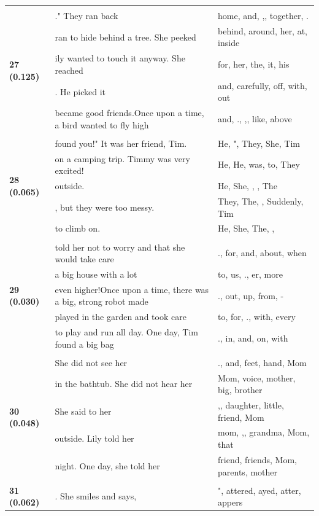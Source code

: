 \documentclass{article}
\theoremstyle{plain}
\theoremstyle{definition}
\theoremstyle{remark}
\begin{document}
\begin{longtable}{|p{}|p{}|p{}|}
& & \\
\multirow{5}{*}{\textbf{27 (0.125)}} & ."  They ran back & home,  and, ,,  together, . \\
& ran to hide behind a tree. She peeked & behind,  around,  her,  at,  inside \\
& ily wanted to touch it anyway. She reached & for,  her,  the,  it,  his \\
& . He picked it & and,  carefully,  off,  with,  out \\
& became good friends.Once upon a time, a bird wanted to fly high & and, ., ,,  like,  above \\
& & \\
\multirow{5}{*}{\textbf{28 (0.065)}} & found you!" It was her friend, Tim. & He,  ",  They,  She,  Tim \\
& on a camping trip. Timmy was very excited! & He, He, was, to,  They \\
& outside. & He,  She,   ,  ,  The \\
& , but they were too messy. & They,  The,   ,  Suddenly,  Tim \\
& to climb on. & He,  She,  The,   , \\
& & \\
\multirow{5}{*}{\textbf{29 (0.030)}} & told her not to worry and that she would take care & .,  for,  and,  about,  when \\
& a big house with a lot & to, us, ., er,  more \\
& even higher!Once upon a time, there was a big, strong robot made & .,  out,  up,  from, - \\
& played in the garden and took care & to,  for, .,  with,  every \\
& to play and run all day. One day, Tim found a big bag & .,  in,  and,  on,  with \\
& & \\
\multirow{5}{*}{\textbf{30 (0.048)}} & She did not see her & .,  and,  feet,  hand,  Mom \\
& in the bathtub.  She did not hear her & Mom,  voice,  mother,  big,  brother \\
& She said to her & ,,  daughter,  little,  friend,  Mom \\
& outside.   Lily told her & mom, ,,  grandma,  Mom,  that \\
& night. One day, she told her & friend,  friends,  Mom,  parents,  mother \\
& & \\
\multirow{5}{*}{\textbf{31 (0.062)}} & . She smiles and says, & ", attered, ayed, atter, appers \\

\end{longtable}
\end{document}
